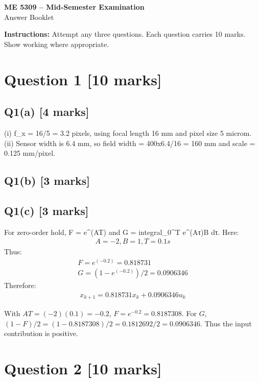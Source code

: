 \documentclass[11pt,a4paper]{article}
\begin{document}
\begin{center}
{\Large\bfseries ME 5309 -- Mid-Semester Examination}\\[3pt]
{\large Answer Booklet}\\[8pt]
\end{center}
\textbf{Instructions:} Attempt any three questions. Each question carries 10 marks. Show working where appropriate.
\section*{Question 1 \hfill [10 marks]}
\subsection*{Q1(a) \hfill [4 marks]}

(i) f\_x = 16/5 = 3.2 pixels, using focal length 16 mm and pixel size 5 microm.
(ii) Sensor width is 6.4 mm, so field width = 400x6.4/16 = 160 mm and scale = 0.125 mm/pixel.

\subsection*{Q1(b) \hfill [3 marks]}

\vspace{2mm}

\subsection*{Q1(c) \hfill [3 marks]}

For zero-order hold, F = e\textasciicircum{}(AT) and G = integral\_0\textasciicircum{}T e\textasciicircum{}(Aτ)B dτ.
Here:\[\begin{aligned}A = -2, B = 1, T = 0.1 s\end{aligned}\]
Thus:\[\begin{aligned}F = e^(-0.2) = 0.818731\\ G = (1-e^(-0.2))/2 = 0.0906346\end{aligned}\]
Therefore:\[\begin{aligned}x_{k+1} = 0.818731 x_k + 0.0906346 u_k\end{aligned}\]\par\smallskip With $AT=(-2)(0.1)=-0.2$, $F=e^{-0.2}=0.8187308$. For $G$, $(1-F)/2=(1-0.8187308)/2=0.1812692/2=0.0906346$. Thus the input contribution is positive.

\section*{Question 2 \hfill [10 marks]}
\end{document}
